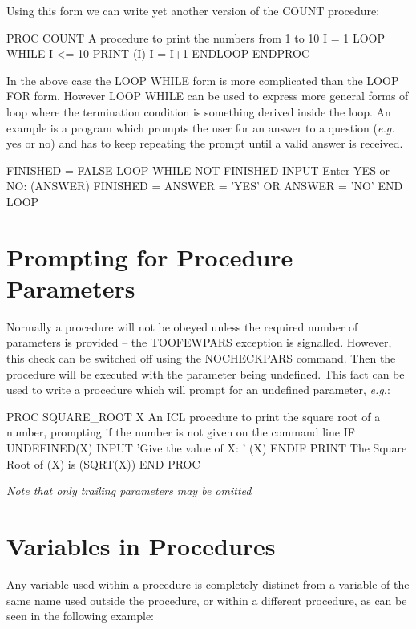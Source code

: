 \documentclass[twoside,11pt,nolof,chapters]{starlink}
\begin{document}
Using this form we can write yet another version of the COUNT procedure:
\begin{terminalv}
    PROC COUNT
        {  A procedure to print the numbers from 1 to 10  }
        I = 1
        LOOP WHILE I <= 10
            PRINT (I)
            I = I+1
        ENDLOOP
    ENDPROC
\end{terminalv}
In the above case the LOOP WHILE form is more complicated than the LOOP FOR
form. However LOOP WHILE can be used to express more general forms of loop
where the termination condition is something derived inside the loop. An
example is a program which prompts the user for an answer to a question
(\emph{e.g.} yes or no) and has to keep repeating the prompt until a valid
answer is received.
\begin{terminalv}
    FINISHED = FALSE
    LOOP WHILE NOT FINISHED
        INPUT Enter YES or NO:  (ANSWER)
        FINISHED = ANSWER = 'YES' OR ANSWER = 'NO'
    END LOOP
\end{terminalv}

\section{Prompting for Procedure Parameters}
Normally a procedure will not be obeyed unless the required number of
parameters is provided -- the TOOFEWPARS exception is signalled.
However, this check can be switched off using the NOCHECKPARS command. Then
the procedure will be executed with the parameter being undefined.
This fact can be used to write a procedure which will prompt for an undefined
parameter, \emph{e.g.}:
\begin{terminalv}
PROC SQUARE_ROOT X
{ An ICL procedure to print the square root of a number,   }
{ prompting if the number is not given on the command line }
  IF UNDEFINED(X)
    INPUT 'Give the value of X: ' (X)
  ENDIF
  PRINT The Square Root of (X) is (SQRT(X))
END PROC
\end{terminalv}
\emph{Note that only trailing parameters may be omitted}

\section{Variables in Procedures}
Any variable used within a procedure is completely distinct from a variable of
the same name used outside the procedure, or within a different procedure, as
can be seen in the following example:
\end{document}
